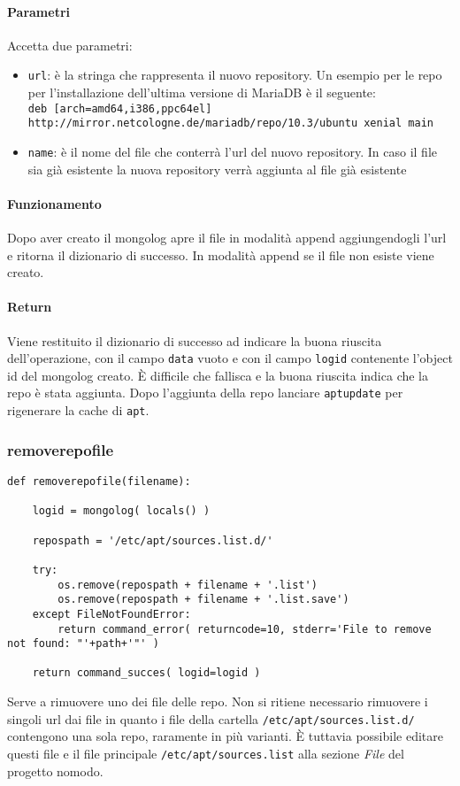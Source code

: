 \documentclass[11pt]{article}
\begin{document}
\paragraph{Parametri}
Accetta due parametri:
\begin{itemize}
	\item{\texttt{url}: è la stringa che rappresenta il nuovo repository. Un esempio per le repo per l'installazione
		dell'ultima versione di MariaDB è il seguente:\\
		\texttt{deb [arch=amd64,i386,ppc64el] http://mirror.netcologne.de/mariadb/repo/10.3/ubuntu xenial main}}
	\item{\texttt{name}: è il nome del file che conterrà l'url del nuovo repository. In caso il file sia già esistente
		la nuova repository verrà aggiunta al file già esistente}
\end{itemize}
\paragraph{Funzionamento}
Dopo aver creato il mongolog apre il file in modalità append aggiungendogli l'url e ritorna il dizionario di successo.
In modalità append se il file non esiste viene creato.
\paragraph{Return}
Viene restituito il dizionario di successo ad indicare la buona riuscita dell'operazione, con il campo \texttt{data} vuoto
e con il campo \texttt{logid} contenente l'object id del mongolog creato. È difficile che fallisca e la buona riuscita indica
che la repo è stata aggiunta. Dopo l'aggiunta della repo lanciare \texttt{aptupdate} per rigenerare la cache di \texttt{apt}.

\subsubsection{removerepofile}\label{removerepofile}
\begin{lstlisting}
def removerepofile(filename):

    logid = mongolog( locals() )

    repospath = '/etc/apt/sources.list.d/'

    try:
        os.remove(repospath + filename + '.list')
        os.remove(repospath + filename + '.list.save')
    except FileNotFoundError:
        return command_error( returncode=10, stderr='File to remove not found: "'+path+'"' )

    return command_succes( logid=logid )
\end{lstlisting}
Serve a rimuovere uno dei file delle repo. Non si ritiene necessario rimuovere i singoli url dai file in quanto i file
della cartella \texttt{/etc/apt/sources.list.d/} contengono una sola repo, raramente in più varianti. È tuttavia possibile
editare questi file e il file principale \texttt{/etc/apt/sources.list} alla sezione \textit{File} del progetto nomodo.
\end{document}

